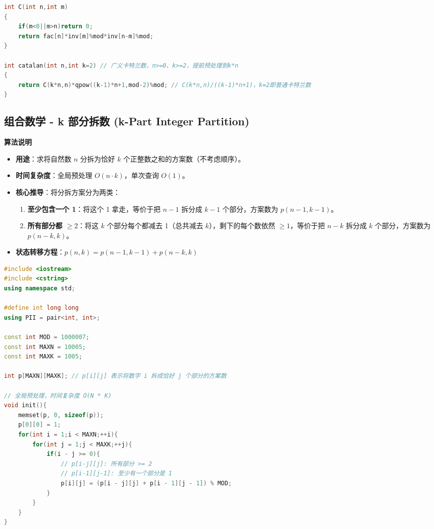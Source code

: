\documentclass[10pt,landscape,a4paper]{article}
\begin{document}
\begin{multicols*}{3}
\begin{lstlisting}[language=C++]
int C(int n,int m)
{
    if(m<0||m>n)return 0;
    return fac[n]*inv[m]%mod*inv[n-m]%mod;
}

int catalan(int n,int k=2) // 广义卡特兰数，n>=0、k>=2，提前预处理到k*n
{
    return C(k*n,n)*qpow((k-1)*n+1,mod-2)%mod; // C(k*n,n)/((k-1)*n+1)，k=2即普通卡特兰数
}
\end{lstlisting}
\subsection*{组合数学 - k 部分拆数 (k-Part Integer Partition)}
\par\addvspace{0.7ex}\noindent\textbf{算法说明}\par\nobreak
\begin{itemize}
\item \textbf{用途}：求将自然数 $n$ 分拆为恰好 $k$ 个正整数之和的方案数（不考虑顺序）。
\item \textbf{时间复杂度}：全局预处理 $O(n \cdot k)$，单次查询 $O(1)$。
\item \textbf{核心推导}：将分拆方案分为两类：
\begin{enumerate}[start=1]
\item \textbf{至少包含一个 1}：将这个 1 拿走，等价于把 $n-1$ 拆分成 $k-1$ 个部分，方案数为 $p(n-1, k-1)$。
\item \textbf{所有部分都 $\ge 2$}：将这 $k$ 个部分每个都减去 1（总共减去 $k$），剩下的每个数依然 $\ge 1$，等价于把 $n-k$ 拆分成 $k$ 个部分，方案数为 $p(n-k, k)$。
\end{enumerate}
\item \textbf{状态转移方程}：$p(n, k) = p(n-1, k-1) + p(n-k, k)$
\end{itemize}
\par{}\par
\begin{lstlisting}[language=C++]
#include <iostream>
#include <cstring>
using namespace std;

#define int long long
using PII = pair<int, int>;

const int MOD = 1000007;
const int MAXN = 10005;
const int MAXK = 1005;

int p[MAXN][MAXK]; // p[i][j] 表示将数字 i 拆成恰好 j 个部分的方案数

// 全局预处理，时间复杂度 O(N * K)
void init(){
    memset(p, 0, sizeof(p));
    p[0][0] = 1;
    for(int i = 1;i < MAXN;++i){
        for(int j = 1;j < MAXK;++j){
            if(i - j >= 0){
                // p[i-j][j]: 所有部分 >= 2
                // p[i-1][j-1]: 至少有一个部分是 1
                p[i][j] = (p[i - j][j] + p[i - 1][j - 1]) % MOD;
            }
        }
    }
}


\end{lstlisting}
\end{multicols*}
\end{document}
